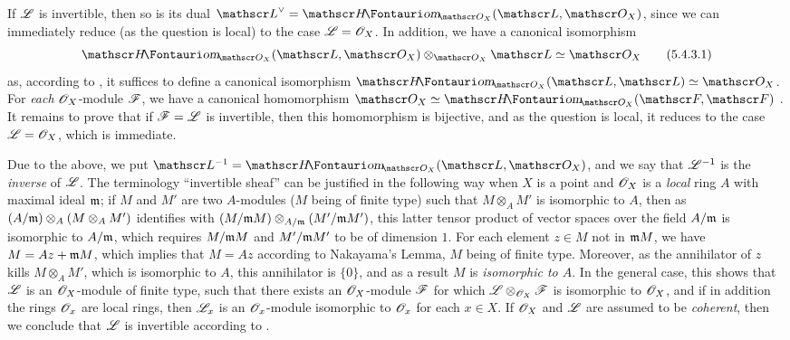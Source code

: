 \begin{env}[5.4.3]
\label{0.5.4.3}
If $\mathscr{L}$ is invertible, then so is its dual $\dual{\sh{L}}=\shHom_{\OO_X}(\sh{L},\OO_X)$, since we can immediately reduce (as the question is local) to the case $\mathscr{L}=\mathscr{O}_X$.
In addition, we have a canonical isomorphism
\[
  \shHom_{\OO_X}(\sh{L},\OO_X)\otimes_{\OO_X}\sh{L}\isoto\OO_X
  \tag{5.4.3.1}
\]
as, according to , it suffices to define a canonical isomorphism $\shHom_{\OO_X}(\sh{L},\sh{L})\isoto\OO_X$.
For \emph{each} $\mathscr{O}_X$-module $\mathscr{F}$, we have a canonical homomorphism $\OO_X\isoto\shHom_{\OO_X}(\sh{F},\sh{F})$ .
It remains to prove that if $\mathscr{F}=\mathscr{L}$ is invertible, then this homomorphism is bijective, and as the question is local, it reduces to the case $\mathscr{L}=\mathscr{O}_X$, which is immediate.

Due to the above, we put $\sh{L}^{-1}=\shHom_{\OO_X}(\sh{L},\OO_X)$, and we say that $\mathscr{L}^{-1}$ is the \emph{inverse} of $\mathscr{L}$.
The terminology ``invertible sheaf'' can be justified in the following way when $X$ is a point and $\mathscr{O}_X$ is a \emph{local} ring $A$ with maximal ideal $\mathfrak{m}$;
if $M$ and $M'$ are two $A$-modules ($M$ being of finite type) such that $M\otimes_A M'$ is isomorphic to $A$, then as $(A/\mathfrak{m})\otimes_A(M\otimes_A M')$ identifies with $(M/\mathfrak{m}M)\otimes_{A/\mathfrak{m}}(M'/\mathfrak{m}M')$, this latter tensor product of vector spaces over the field $A/\mathfrak{m}$ is isomorphic to $A/\mathfrak{m}$, which requires $M/\mathfrak{m}M$ and $M'/\mathfrak{m}M'$ to be of dimension $1$.
For each element $z\in M$ not in $\mathfrak{m}M$, we have $M=Az+\mathfrak{m}M$, which implies that $M=Az$ according to Nakayama's Lemma, $M$ being of finite type.
Moreover, as the annihilator of $z$ kills $M\otimes_A M'$, which is isomorphic to $A$, this annihilator is $\{0\}$, and as a result $M$ is \emph{isomorphic to $A$}.
In the general case, this shows that $\mathscr{L}$ is an $\mathscr{O}_X$-module of finite type, such that there exists an $\mathscr{O}_X$-module $\mathscr{F}$ for which $\mathscr{L}\otimes_{\mathscr{O}_X}\mathscr{F}$ is isomorphic to $\mathscr{O}_X$, and if in addition the rings $\mathscr{O}_x$ are local rings, then $\mathscr{L}_x$ is an $\mathscr{O}_x$-module isomorphic to $\mathscr{O}_x$ for each $x\in X$.
If $\mathscr{O}_X$ and $\mathscr{L}$ are assumed to be \emph{coherent}, then we conclude that $\mathscr{L}$ is invertible according to .
\end{env}

